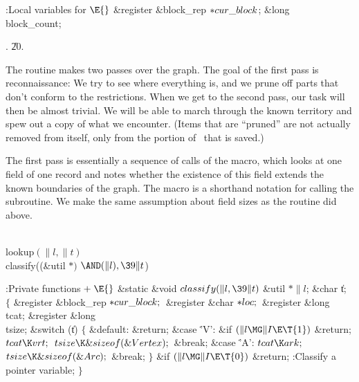 \B{}:Local variables for \X${}\E{}$\6
\&{register} \&{block\_rep} ${}{*}\\{cur\_block}{}$;\6
\&{long} \\{block\_count};\par
{}.
\U20.\fi

The  routine makes two passes over the graph. The
goal of the first pass is reconnaissance: We try to see where everything
is, and we prune off parts that don't conform to the restrictions.
When we get to the second pass, our task will then be almost trivial.
We will be able to march through the known territory and spew out a copy
of what we encounter. (Items that are ``pruned'' are not actually
removed from  itself, only from the portion of~ that is saved.)

The first pass is essentially a sequence of calls of the  macro,
which looks at one field of one record and notes whether
the existence of this field extends the known boundaries of the graph.
The  macro is a shorthand notation for calling the 
subroutine. We make the same assumption about field sizes as the
 routine did above.

\Y\B\4\D\\{lookup}$(\|l,\|t)$\5
\\{classify}((\&{util} ${}{*}){}$ ${}{\AND}(\|l),\39\|t{}$)\par
\Y\B\4:Private functions\X${}\mathrel+\E{}$\6
\1\1\&{static} \&{void} ${}\\{classify}(\|l,\39\|t){}$\6
\&{util} ${}{*}\|l{}$;\6
\&{char} \|t;\2\2\6
${}\{{}$\5
\1\&{register} \&{block\_rep} ${}{*}\\{cur\_block};{}$\6
\&{register} \&{char} ${}{*}\\{loc};{}$\6
\&{register} \&{long} \\{tcat};\6
\&{register} \&{long} \\{tsize};\7
\&{switch} (\|t)\5
${}\{{}$\1\6
\4\&{default}:\5
\&{return};\6
\4\&{case} \.{'V'}:\6
\&{if} ${}(\|l\MG\|I\E\T{1}){}$\1\5
\&{return};\2\6
${}\\{tcat}\K\\{vrt};{}$\6
${}\\{tsize}\K\&{sizeof}(\&{Vertex});{}$\6
\&{break};\6
\4\&{case} \.{'A'}:\5
${}\\{tcat}\K\\{ark};{}$\6
${}\\{tsize}\K\&{sizeof}(\&{Arc});{}$\6
\&{break};\6
\4${}\}{}$\2\6
\&{if} ${}(\|l\MG\|I\E\T{0}){}$\1\5
\&{return};\2\6
:Classify a pointer variable\X;\6
\4${}\}{}$\2\par
\fi

